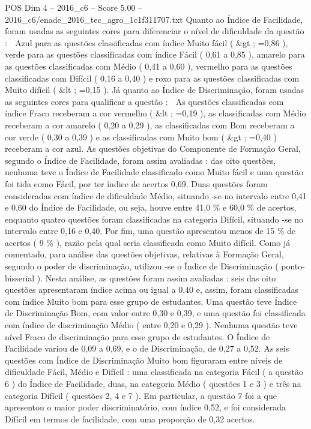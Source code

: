\begin{textsample}{POS Dim 4 – 2016\_c6 – Score 5.00 – 2016\_c6/enade\_2016\_tec\_agro\_1c1f311707.txt}
Quanto ao Índice de Facilidade, foram usadas as seguintes cores para diferenciar o nível de dificuldade da questão :  Azul para as questões classificadas com índice Muito fácil ( \&gt ; =0,86 ), verde para as questões classificadas com índice Fácil ( 0,61 a 0,85 ), amarelo para as questões classificadas com Médio ( 0,41 a 0,60 ), vermelho para as questões classificadas com Difícil ( 0,16 a 0,40 ) e roxo para as questões classificadas com Muito difícil ( \&lt ; =0,15 ).
Já quanto ao Índice de Discriminação, foram usadas as seguintes cores para qualificar a questão :  As questões classificadas com índice Fraco receberam a cor vermelho ( \&lt ; =0,19 ), as classificadas com Médio receberam a cor amarelo ( 0,20 a 0,29 ), as classificadas com Bom receberam a cor verde ( 0,30 a 0,39 ) e as classificadas com Muito bom ( \&gt ; =0,40 ) receberam a cor azul.
As questões objetivas do Componente de Formação Geral, segundo o Índice de Facilidade, foram assim avaliadas : das oito questões, nenhuma teve o Índice de Facilidade classificado como Muito fácil e uma questão foi tida como Fácil, por ter índice de acertos 0,69.
Duas questões foram consideradas com índice de dificuldade Médio, situando -se no intervalo entre 0,41 e 0,60 do Índice de Facilidade, ou seja, houve entre 41,0 \% e 60,0 \% de acertos, enquanto quatro questões foram classificadas na categoria Difícil, situando -se no intervalo entre 0,16 e 0,40.
Por fim, uma questão apresentou menos de 15 \% de acertos ( 9 \% ), razão pela qual seria classificada como Muito difícil.
Como já comentado, para análise das questões objetivas, relativas à Formação Geral, segundo o poder de discriminação, utilizou -se o Índice de Discriminação ( ponto-bisserial ).
Nesta análise, as questões foram assim avaliadas : seis das oito questões apresentaram índice acima ou igual a 0,40 e, assim, foram classificadas com índice Muito bom para esse grupo de estudantes.
Uma questão teve Índice de Discriminação Bom, com valor entre 0,30 e 0,39, e uma questão foi classificada com índice de discriminação Médio ( entre 0,20 e 0,29 ).
Nenhuma questão teve nível Fraco de discriminação para esse grupo de estudantes.
O Índice de Facilidade variou de 0,09 a 0,69, e o de Discriminação, de 0,27 a 0,52.
As seis questões com Índice de Discriminação Muito bom figuraram entre níveis de dificuldade Fácil, Médio e Difícil : uma classificada na categoria Fácil ( a questão 6 ) do Índice de Facilidade, duas, na categoria Médio ( questões 1 e 3 ) e três na categoria Difícil ( questões 2, 4 e 7 ).
Em particular, a questão 7 foi a que apresentou o maior poder discriminatório, com índice 0,52, e foi considerada Difícil em termos de facilidade, com uma proporção de 0,32 acertos.

\end{textsample}
